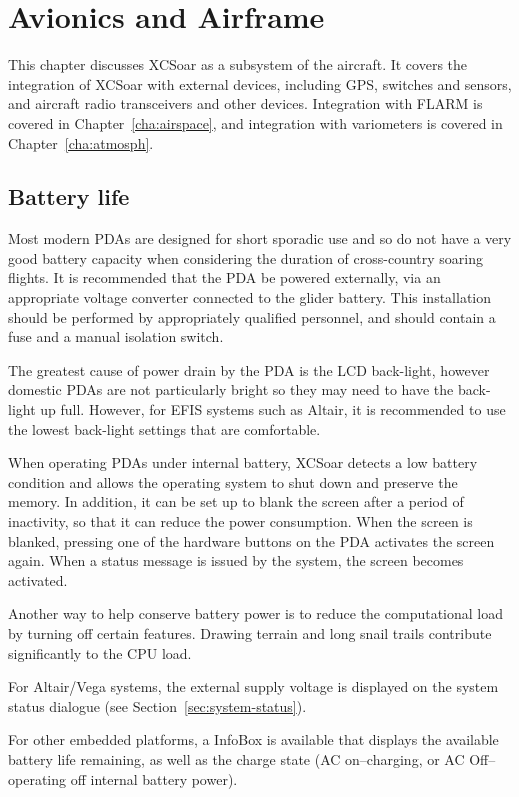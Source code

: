 \chapter{Avionics and Airframe}\label{cha:avionics-airframe}

This chapter discusses XCSoar as a subsystem of the aircraft.  It
covers the integration of XCSoar with external devices, including GPS,
switches and sensors, and aircraft radio transceivers and other
devices.  Integration with FLARM is covered in
Chapter~\ref{cha:airspace}, and integration with variometers is
covered in Chapter~\ref{cha:atmosph}.

\section{Battery life}

Most modern PDAs are designed for short sporadic use and so do not
have a very good battery capacity when considering the duration of
cross-country soaring flights.  It is recommended that the PDA be powered
externally, via an appropriate voltage converter connected to the glider battery. 
This installation should be performed by appropriately qualified personnel, 
and should contain a fuse and a manual isolation switch.

The greatest cause of power drain by the PDA is the LCD back-light,
however domestic PDAs are not particularly bright so they may need to
have the back-light up full. However, for EFIS systems such as Altair,
it is recommended to use the lowest back-light settings that are
comfortable.

When operating PDAs under internal battery, XCSoar detects a low
battery condition and allows the operating system to shut down and
preserve the memory.  In addition, it can be set up to blank the
screen after a period of inactivity, so that it can reduce the power
consumption.  When the screen is blanked, pressing one of the hardware
buttons on the PDA activates the screen again.  When a status message
is issued by the system, the screen becomes activated.

Another way to help conserve battery power is to reduce the
computational load by turning off certain features.  Drawing terrain
and long snail trails contribute significantly to the CPU load.

For Altair/Vega systems, the external supply voltage is displayed on
the system status dialogue (see Section~\ref{sec:system-status}).

For other embedded platforms, a  InfoBox is available that 
displays the available battery life remaining, as well as the charge state 
(AC on--charging, or AC Off--operating off internal battery power).

